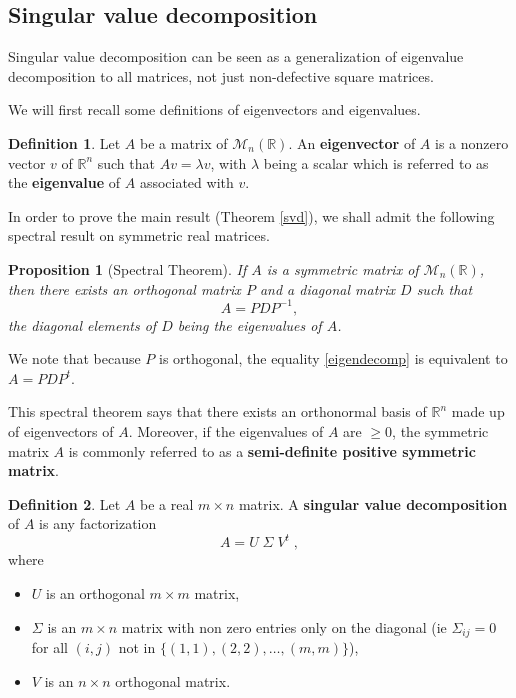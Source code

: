 \documentclass{report}
\newtheorem{prop}{Proposition}
\theoremstyle{definition}
\newtheorem{defin}{Definition}
\theoremstyle{remark}
\begin{document}
\bigskip


\subsection{Singular value decomposition}


Singular value decomposition can be seen as a generalization of eigenvalue decomposition to all matrices, not just non-defective square matrices.

We will first recall some definitions of eigenvectors and eigenvalues.

\begin{defin}
        Let $A$ be a matrix of $\mathcal{M}_{n}(\mathbb{R})$. An \textbf{eigenvector} of $A$ is a nonzero vector $v$ of $\mathbb{R}^n$ such that $Av = \lambda v$, with $\lambda$ being a scalar which is referred to as the \textbf{eigenvalue} of $A$ associated with $v$. 
\end{defin}

\medskip
In order to prove the main result (Theorem \ref{svd}), we shall admit the following spectral result on symmetric real matrices.

\begin{prop}[Spectral Theorem]\label{spectralthrm}
        If $A$ is a symmetric matrix of $\mathcal{M}_{n}(\mathbb{R})$, then there exists an orthogonal matrix $P$ and a diagonal matrix $D$ such that
        \begin{equation}\label{eigendecomp}
                A = PDP^{-1},
        \end{equation}
        the diagonal elements of $D$ being the eigenvalues of $A$.
\end{prop}


We note that because $P$ is orthogonal, the equality \ref{eigendecomp} is equivalent to $A = PDP^t $.

This spectral theorem says that there exists an orthonormal basis of $\mathbb{R}^n$ made up of eigenvectors of $A$. Moreover, if the eigenvalues of $A$ are $\geq 0$, the symmetric matrix $A$ is commonly referred to as a \textbf{semi-definite positive symmetric matrix}.
 
 
\bigskip
\begin{defin}
        Let $A$ be a real $m \times n$ matrix. A \textbf{singular value decomposition} of $A$ is any factorization
        \begin{equation*}
                A = U \; \Sigma \; V^t  \;,
        \end{equation*}
        where \begin{itemize}
            \item 
        $ U$ is an orthogonal $m \times m$ matrix, 
        \item $\Sigma$ is an $m \times n$ matrix with non zero entries only on the diagonal (ie $\Sigma_{ij} = 0$ for all $(i,j)$ not in $\{(1,1),(2,2),\dots,(m,m)\}$), 
        \item $V$ is an $n \times n$ orthogonal matrix.
        \end{itemize}
\end{defin}
\end{document}
